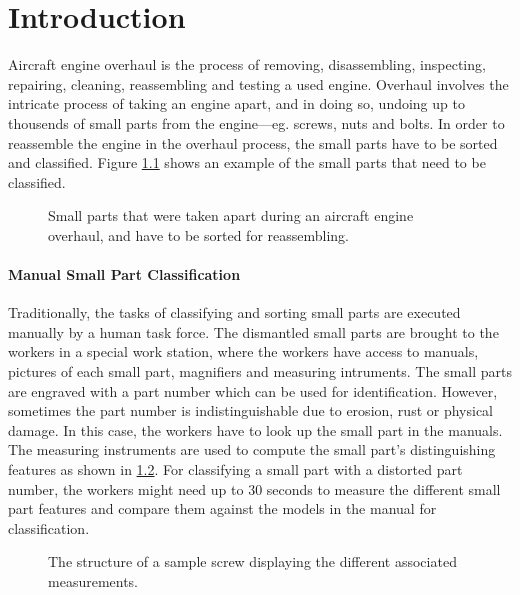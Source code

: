 \chapter{Introduction}\label{ch:introduction}

Aircraft engine overhaul is the process of removing, disassembling, inspecting, repairing, cleaning, reassembling and testing a used engine. Overhaul involves the intricate process of taking an engine apart, and in doing so, undoing up to thousends of small parts from the engine—eg. screws, nuts and bolts. In order to reassemble the engine in the overhaul process, the small parts have to be sorted and classified. Figure \ref{fig:unclassified_small_parts} shows an example of the small parts that need to be classified.

\begin{figure}[H]
\centering
{}
\caption{Small parts that were taken apart during an aircraft engine overhaul, and have to be sorted for reassembling.}
\label{fig:unclassified_small_parts}
\end{figure}

\subsubsection{Manual Small Part Classification}

Traditionally, the tasks of classifying and sorting small parts are executed manually by a human task force. The dismantled small parts are brought to the workers in a special work station, where the workers have access to manuals, pictures of each small part, magnifiers and measuring intruments. The small parts are engraved with a part number which can be used for identification. However, sometimes the part number is indistinguishable due to erosion, rust or physical damage. In this case, the workers have to look up the small part in the manuals. The measuring instruments are used to compute the small part's distinguishing features as shown in \ref{fig:small_part_structure}. For classifying a small part with a distorted part number, the workers might need up to 30 seconds to measure the different small part features and compare them against the models in the manual for classification.

\begin{figure}[H]
\centering
{}
\caption{The structure of a sample screw displaying the different associated measurements.}
\label{fig:small_part_structure}
\end{figure}

